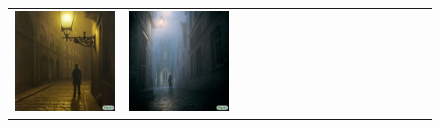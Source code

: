 \begin{figure}[ht!]
\begin{adjustwidth}{-0.8in}{-0.5in}
\begin{tabular}{cccccccccccccccccccc}
\multicolumn{3}{c}{\includegraphics[width=\twobytwocolwidth\textwidth]{figures/cherries/gothic_2.jpg}} &
\multicolumn{3}{c}{\includegraphics[width=\twobytwocolwidth\textwidth]{figures/cherries/gothic_3.jpg}} &&

\end{tabular}
\end{adjustwidth}
\end{figure}
